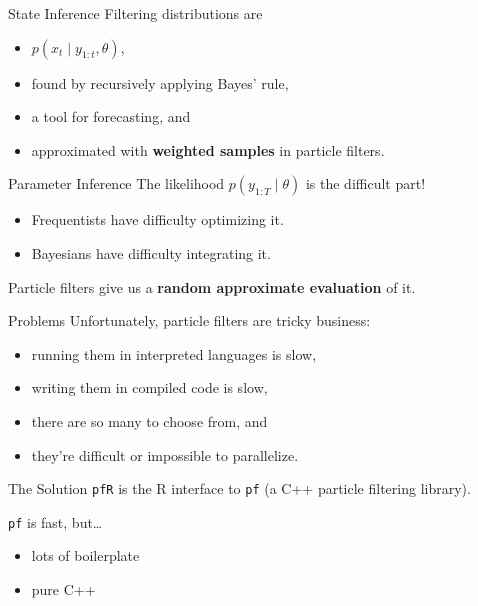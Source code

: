 \documentclass[
  ignorenonframetext,
]{beamer}
\providecommand{\tightlist}{%
  \setlength{\itemsep}{0pt}\setlength{\parskip}{0pt}}
\begin{document}
\begin{frame}{State Inference}
\protect\hypertarget{state-inference}{}
Filtering distributions are

\begin{itemize}
\tightlist
\item
  \(p(x_t \mid y_{1:t}, \theta)\),
\item
  found by recursively applying Bayes' rule,
\item
  a tool for forecasting, and
\item
  approximated with \textbf{weighted samples} in particle filters.
\end{itemize}
\end{frame}

\begin{frame}{Parameter Inference}
\protect\hypertarget{parameter-inference}{}
The likelihood \(p(y_{1:T} \mid \theta)\) is the difficult part!

\begin{itemize}
\tightlist
\item
  Frequentists have difficulty optimizing it.
\item
  Bayesians have difficulty integrating it.
\end{itemize}

Particle filters give us a \textbf{random approximate evaluation} of it.
\end{frame}

\begin{frame}{Problems}
\protect\hypertarget{problems}{}
Unfortunately, particle filters are tricky business:

\begin{itemize}
\tightlist
\item
  running them in interpreted languages is slow,
\item
  writing them in compiled code is slow,
\item
  there are so many to choose from, and
\item
  they're difficult or impossible to parallelize.
\end{itemize}
\end{frame}

\begin{frame}[fragile]{The Solution}
\protect\hypertarget{the-solution}{}
\texttt{pfR} is the R interface to \texttt{pf} (a C++ particle filtering
library).

\texttt{pf} is fast, but\ldots{}

\begin{itemize}
\tightlist
\item
  lots of boilerplate
\item
  pure C++
\end{itemize}
\end{frame}
\end{document}
